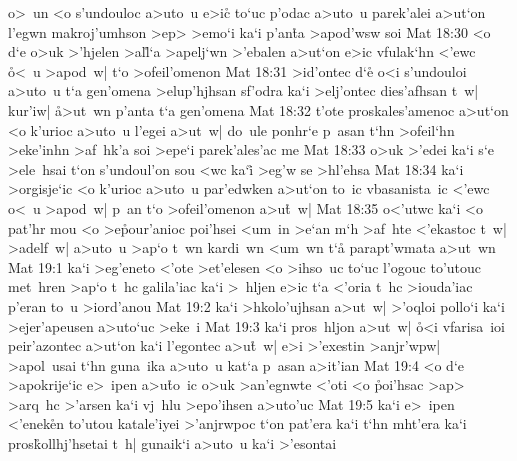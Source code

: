 o>~un
<o
s'undouloc
a>uto~u
e>ic\r{}
to`uc
p'odac
a>uto~u
parek'alei
a>ut`on
l'egwn
makroj'umhson
>ep>
>emo`i
ka`i
p'an\r{t}a
>apod'wsw
soi\bibvsend
\vs Mat 18:30
<o
d`e
o>uk
>'hjelen
>al\r{l}`a
>apelj`wn
>'ebalen
a>ut`on
e>ic
vfulak`hn
<'ewc
\r{o}<~u
>apod~w|
t`o
>ofeil'omenon\bibvsend
\vs Mat 18:31
>id'ontec
d`e\r{}
o<i
s'undouloi
a>uto~u
t`a
gen'omena
>elup'hjhsan
sf'odra
ka`i
>elj'ontec
dies'afhsan
t~w|
kur'iw|
\r{a}>ut~wn
p'anta
t`a
gen'omena\bibvsend
\vs Mat 18:32
t'ote
proskales'amenoc
a>ut`on
<o
k'urioc
a>uto~u
l'egei
a>ut~w|
do~ule
ponhr`e
p~asan
t`hn
>ofeil`hn
>eke'inhn
>af~hk'a
soi
>epe`i
parek'ales'ac
me\bibvsend
\vs Mat 18:33
o>uk
>'edei
ka`i
s`e
>ele~hsai
t`on
s'undoul'on
sou
<wc
ka`i\r{}
>eg'w
se
>hl'ehsa\bibvsend
\vs Mat 18:34
ka`i
>orgisje`ic
<o
k'urioc
a>uto~u
par'edwken
a>ut`on
to~ic
vbasanista~ic
<'ewc
o<~u
>apod~w|
p~an
t`o
>ofeil'omenon
a>u\r{t}~w|\bibvsend
{}
\vs Mat 18:35
o<'utwc
ka`i
<o
pat'hr
mou
<o
>e\r{p}our'anioc
poi'hsei
<um~in
>e`an
m`h
>af~hte
<'ekastoc
t~w|
>adelf~w|
a>uto~u
>ap`o
t~wn
kardi~wn
<um~wn
t`a\r{}
parapt'wmata
a>ut~wn\bibvsend
\vs Mat 19:1
ka`i
>eg'eneto
<'ote
>et'elesen
<o
>ihso~uc
to`uc
l'ogouc
to'utouc
met~hren
>ap`o
t~hc
galila'iac
ka`i
>~hljen
e>ic
t`a
<'oria
t~hc
>iouda'iac
p'eran
to~u
>iord'anou\bibvsend
\vs Mat 19:2
ka`i
>hkolo'ujhsan
a>ut~w|
>'oqloi
pollo`i
ka`i
>ejer'apeusen
a>uto`uc
>eke~i\bibvsend
\vs Mat 19:3
ka`i
pros~hljon
a>ut~w|
\r{o}<i
vfarisa~ioi
peir'azontec
a>ut`on
ka`i
l'egontec
a>u\r{t}~w|
e>i
>'exestin
>anjr'wpw|
>apol~usai
t`hn
guna~ika
a>uto~u
kat`a
p~asan
a>it'ian\bibvsend
\vs Mat 19:4
<o
d`e
>apokrije`ic
e>~ipen
a>u\r{t}o~ic
o>uk
>an'egnwte
<'oti
<o
\r{p}oi'hsac
>ap>
>arq~hc
>'arsen
ka`i
vj~hlu
>epo'ihsen
a>uto'uc\bibvsend
\vs Mat 19:5
ka`i
e>~ipen
<'enek\r{e}n
to'utou
katale'iyei
>'anjrwpoc
t`on
pat'era
ka`i
t`hn
mht'era
ka`i
pros\r{k}ollhj'hsetai
t~h|
gunaik`i
a>uto~u
ka`i
>'esontai

